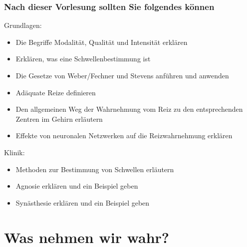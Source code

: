 \documentclass{beamer}
\begin{document}
\begin{frame}

 \frametitle{Nach dieser Vorlesung sollten Sie folgendes können}



\begin{block}{Grundlagen:}




\begin{itemize}

    \item 
Die Begriffe Modalität, Qualität und Intensität erklären
    \item 
Erklären, was eine Schwellenbestimmung ist 
    \item 
Die Gesetze von Weber/Fechner und Stevens anführen und anwenden
    \item 
Adäquate Reize definieren
    \item 
Den allgemeinen Weg der Wahrnehmung vom Reiz zu den entsprechenden Zentren im Gehirn erläutern 
    \item 
Effekte von neuronalen Netzwerken auf die Reizwahrnehmung erklären
\end{itemize}


\end{block}



 

\begin{block}{Klinik:}

\begin{itemize}
    
\item 
Methoden zur Bestimmung von Schwellen erläutern 
\item
Agnosie erklären und ein Beispiel geben
\item
Synästhesie erklären und ein Beispiel geben


\end{itemize}


\end{block}



\end{frame}



 

\section{Was nehmen wir wahr?}
\end{document}
